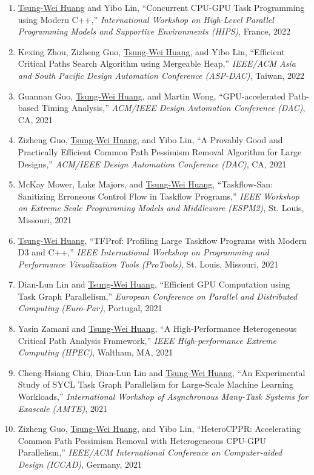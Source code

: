 \documentclass[A4,11pt]{article}
\begin{document}
\begin{enumerate}
    \item \underline{Tsung-Wei Huang} and Yibo Lin, ``Concurrent CPU-GPU Task Programming using Modern C++,'' \textit{International Workshop on High-Level Parallel Programming Models and Supportive Environments (HIPS)}, France, 2022
    \item Kexing Zhou, Zizheng Guo, \underline{Tsung-Wei Huang}, and Yibo Lin, ``Efficient Critical Paths Search Algorithm using Mergeable Heap,'' \textit{IEEE/ACM Asia and South Pacific Design Automation Conference (ASP-DAC)}, Taiwan, 2022
    \item Guannan Guo, \underline{Tsung-Wei Huang}, and Martin Wong, ``GPU-accelerated Path-based Timing Analysis,'' \textit{ACM/IEEE Design Automation Conference (DAC)}, CA, 2021
    \item Zizheng Guo, \underline{Tsung-Wei Huang}, and Yibo Lin, ``A Provably Good and Practically Efficient Common Path Pessimism Removal Algorithm for Large Designs,'' \textit{ACM/IEEE Design Automation Conference (DAC)}, CA, 2021
    \item McKay Mower, Luke Majors, and \underline{Tsung-Wei Huang}, ``Taskflow-San: Sanitizing Erroneous Control Flow in Taskflow Programs,'' \textit{IEEE Workshop on Extreme Scale Programming Models and Middleware (ESPM2)}, St. Louis, Missouri, 2021
    \item \underline{Tsung-Wei Huang}, ``TFProf: Profiling Large Taskflow Programs with Modern D3 and C++,'' \textit{IEEE International Workshop on Programming and Performance Visualization Tools (ProTools)}, St. Louis, Missouri, 2021
    \item Dian-Lun Lin and \underline{Tsung-Wei Huang}, ``Efficient GPU Computation using Task Graph Parallelism,'' \textit{European Conference on Parallel and Distributed Computing (Euro-Par)}, Portugal, 2021
    \item Yasin Zamani and \underline{Tsung-Wei Huang}, ``A High-Performance Heterogeneous Critical Path Analysis Framework,'' \textit{IEEE High-performance Extreme Computing (HPEC)}, Waltham, MA, 2021
    \item Cheng-Hsiang Chiu, Dian-Lun Lin and \underline{Tsung-Wei Huang}, ``An Experimental Study of SYCL Task Graph Parallelism for Large-Scale Machine Learning Workloads,'' \textit{International Workshop of Asynchronous Many-Task Systems for Exascale (AMTE)}, 2021
    \item Zizheng Guo, \underline{Tsung-Wei Huang}, and Yibo Lin, ``HeteroCPPR: Accelerating Common Path Pessimism Removal with Heterogeneous CPU-GPU Parallelism,'' \textit{IEEE/ACM International Conference on Computer-aided Design (ICCAD)}, Germany, 2021

\end{enumerate}
\end{document}
